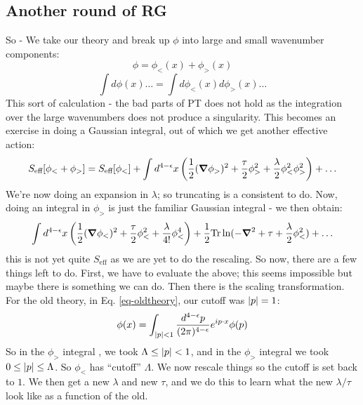 \subsection{Another round of RG}
So -  We take our theory and break up $\phi$ into large and small wavenumber components:
\begin{equation}
    \phi = \phi_<(x) + \phi_>(x)
\end{equation}
\begin{equation}
    \int d\phi(x)\ldots = \int d\phi_<(x)d\phi_>(x)\ldots
\end{equation}
This sort of calculation - the bad parts of PT does not hold as the integration over the large wavenumbers does not produce a singularity. This becomes an exercise in doing a Gaussian integral, out of which we get another effective action:
\begin{equation}
    S_{\text{eff}}[\phi_< + \phi_>] = S_{\text{eff}}[\phi_<] + \int d^{4-\e}x\left(\frac{1}{2}(\nabla \phi_>)^2 + \frac{\tau}{2}\phi_>^2 + \frac{\lambda}{2}\phi_<^2\phi_>^2\right) + \ldots
\end{equation}
We're now doing an expansion in $\lambda$; so truncating is a consistent to do. Now, doing an integral in $\phi_>$ is just the familiar Gaussian integral - we then obtain:
\begin{equation}
    \int d^{4-\e}x \left(\frac{1}{2}(\nabla \phi_<)^2 + \frac{\tau}{2}\phi_<^2 + \frac{\lambda}{4!}\phi_<^4\right) + \frac{1}{2}\Tr\ln(-\nabla^2 + \tau + \frac{\lambda}{2}\phi_<^2) + \ldots
\end{equation}
this is not yet quite $S_{\text{eff}}$ as we are yet to do the rescaling. So now, there are a few things left to do. First, we have to evaluate the above; this seems impossible but maybe there is something we can do. Then there is the scaling transformation. For the old theory, in Eq. \eqref{eq-oldtheory}, our cutoff was $\lvert p \rvert = 1$:
\begin{equation}
    \phi(x) = \int_{\abs{p} < 1} \frac{d^{4-\e}p}{(2\pi)^{4-\e}}e^{ip \cdot x}\phi(p)
\end{equation}
So in the $\phi_>$ integral , we took $\Lambda \leq \lvert p \rvert < 1$, and in the $\phi_>$ integral we took $0 \leq \lvert p \rvert \leq \Lambda$. So $\phi_<$ has ``cutoff'' $\Lambda$. We now rescale things so the cutoff is set back to $1$. We then get a new $\lambda$ and new $\tau$, and we do this to learn what the new $\lambda/\tau$ look like as a function of the old.

